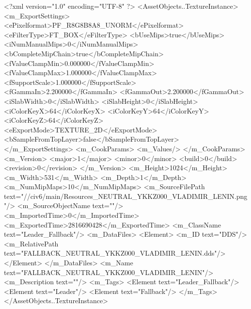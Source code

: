 <?xml version="1.0" encoding="UTF-8" ?>
<AssetObjects..TextureInstance>
	<m_ExportSettings>
		<ePixelformat>PF_R8G8B8A8_UNORM</ePixelformat>
		<eFilterType>FT_BOX</eFilterType>
		<bUseMips>true</bUseMips>
		<iNumManualMips>0</iNumManualMips>
		<bCompleteMipChain>true</bCompleteMipChain>
		<fValueClampMin>0.000000</fValueClampMin>
		<fValueClampMax>1.000000</fValueClampMax>
		<fSupportScale>1.000000</fSupportScale>
		<fGammaIn>2.200000</fGammaIn>
		<fGammaOut>2.200000</fGammaOut>
		<iSlabWidth>0</iSlabWidth>
		<iSlabHeight>0</iSlabHeight>
		<iColorKeyX>64</iColorKeyX>
		<iColorKeyY>64</iColorKeyY>
		<iColorKeyZ>64</iColorKeyZ>
		<eExportMode>TEXTURE_2D</eExportMode>
		<bSampleFromTopLayer>false</bSampleFromTopLayer>
	</m_ExportSettings>
	<m_CookParams>
		<m_Values/>
	</m_CookParams>
	<m_Version>
		<major>1</major>
		<minor>0</minor>
		<build>0</build>
		<revision>0</revision>
	</m_Version>
	<m_Height>1024</m_Height>
	<m_Width>531</m_Width>
	<m_Depth>1</m_Depth>
	<m_NumMipMaps>10</m_NumMipMaps>
	<m_SourceFilePath text="//civ6/main/Resources\FALLBACK_NEUTRAL_YKKZ000_VLADIMIR_LENIN.png"/>
	<m_SourceObjectName text=""/>
	<m_ImportedTime>0</m_ImportedTime>
	<m_ExportedTime>2816690428</m_ExportedTime>
	<m_ClassName text="Leader_Fallback"/>
	<m_DataFiles>
		<Element>
			<m_ID text="DDS"/>
			<m_RelativePath text="FALLBACK_NEUTRAL_YKKZ000_VLADIMIR_LENIN.dds"/>
		</Element>
	</m_DataFiles>
	<m_Name text="FALLBACK_NEUTRAL_YKKZ000_VLADIMIR_LENIN"/>
	<m_Description text=""/>
	<m_Tags>
		<Element text="Leader_Fallback"/>
		<Element text="Leader"/>
		<Element text="Fallback"/>
	</m_Tags>
</AssetObjects..TextureInstance>

